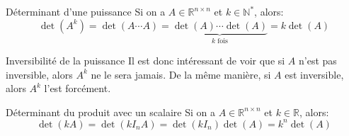 \documentclass[a4paper]{article}
\begin{document}
\begin{parag}{Déterminant d'une puissance}
    Si on a $A \in \mathbb{R}^{n \times n}$ et $k \in \mathbb{N}^*$, alors:
    \[\det\left(A^{k}\right) = \det\left(A \cdots A\right) = \underbrace{\det\left(A\right)\cdots \det\left(A\right)}_{k \text{ fois}} = k\det\left(A\right)\]

    \begin{subparag}{Inversibilité de la puissance}
        Il est donc intéressant de voir que si $A$ n'est pas inversible, alors $A^{k}$ ne le sera jamais. De la même manière, si $A$ est inversible, alors $A^{k}$ l'est forcément.
    \end{subparag}

\end{parag}

\begin{parag}{Déterminant du produit avec un scalaire}
    Si on a $A \in \mathbb{R}^{n\times n}$ et $k \in \mathbb{R}$, alors:
    \[\det\left(kA\right) = \det\left(kI_n A\right) = \det\left(k I_n\right) \det\left(A\right) = k^{n}\det\left(A\right)\]

\end{parag}
\end{document}
